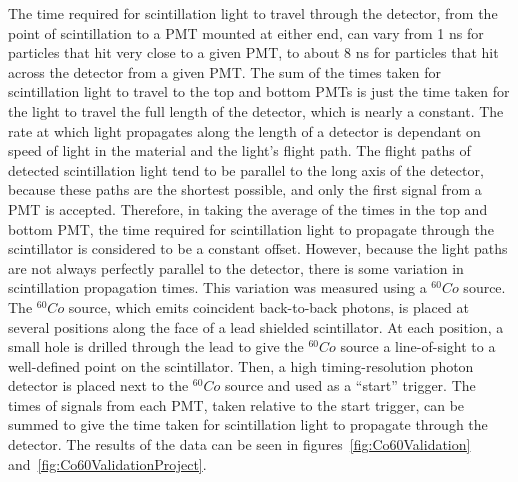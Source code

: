 The time required for scintillation light to travel through the detector, from the point of scintillation to a PMT mounted at either end, can vary from 1 ns for particles that hit very close to a given PMT, to about 8 ns for particles that hit across the detector from a given PMT.
The sum of the times taken for scintillation light to travel to the top and bottom PMTs is just the time taken for the light to travel the full length of the detector, which is nearly a constant.
The rate at which light propagates along the length of a detector is dependant on speed of light in the material and the light's flight path.
The flight paths of detected scintillation light tend to be parallel to the long axis of the detector, because these paths are the shortest possible, and only the first signal from a PMT is accepted.
Therefore, in taking the average of the times in the top and bottom PMT, the time required for scintillation light to propagate through the scintillator is considered to be a constant offset.
However, because the light paths are not always perfectly parallel to the detector, there is some variation in scintillation propagation times.
This variation was measured using a $^{60}Co$ source.
The $^{60}Co$ source, which emits coincident back-to-back photons, is placed at several positions along the face of a lead shielded scintillator.
At each position, a small hole is drilled through the lead to give the $^{60}Co$ source a line-of-sight to a well-defined point on the scintillator.
Then, a high timing-resolution photon detector is placed next to the $^{60}Co$ source and used as a ``start'' trigger.
The times of signals from each PMT, taken relative to the start trigger, can be summed to give the time taken for scintillation light to propagate through the detector.
The results of the data can be seen in figures~\ref{fig:Co60Validation} and~\ref{fig:Co60ValidationProject}.
